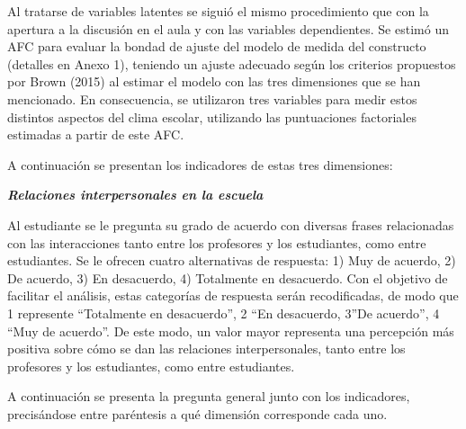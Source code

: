 \documentclass[12pt,twoside]{templates/facsothesis}
\begin{document}
Al tratarse de variables latentes se siguió el mismo procedimiento que con la apertura a la discusión en el aula y con las variables dependientes. Se estimó un AFC para evaluar la bondad de ajuste del modelo de medida del constructo (detalles en Anexo 1), teniendo un ajuste adecuado según los criterios propuestos por Brown (2015) al estimar el modelo con las tres dimensiones que se han mencionado. En consecuencia, se utilizaron tres variables para medir estos distintos aspectos del clima escolar, utilizando las puntuaciones factoriales estimadas a partir de este AFC.

A continuación se presentan los indicadores de estas tres dimensiones:

\newpage

\textbf{\emph{Relaciones interpersonales en la escuela}}

Al estudiante se le pregunta su grado de acuerdo con diversas frases relacionadas con las interacciones tanto entre los profesores y los estudiantes, como entre estudiantes. Se le ofrecen cuatro alternativas de respuesta: 1) Muy de acuerdo, 2) De acuerdo, 3) En desacuerdo, 4) Totalmente en desacuerdo. Con el objetivo de facilitar el análisis, estas categorías de respuesta serán recodificadas, de modo que 1 represente ``Totalmente en desacuerdo'', 2 ``En desacuerdo, 3''De acuerdo'', 4 ``Muy de acuerdo''. De este modo, un valor mayor representa una percepción más positiva sobre cómo se dan las relaciones interpersonales, tanto entre los profesores y los estudiantes, como entre estudiantes.

A continuación se presenta la pregunta general junto con los indicadores, precisándose entre paréntesis a qué dimensión corresponde cada uno.
\end{document}
